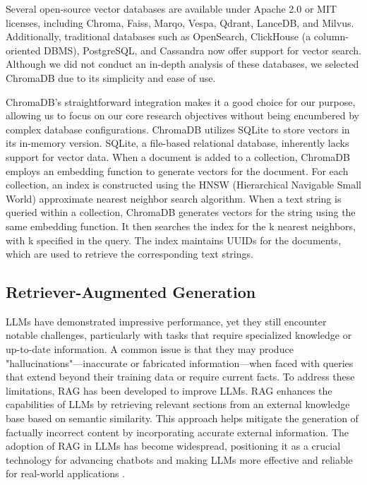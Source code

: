 Several open-source vector databases are available under Apache 2.0 or MIT licenses, including Chroma, Faiss, Marqo, Vespa, Qdrant, LanceDB, and Milvus. Additionally, traditional databases such as OpenSearch, ClickHouse (a column-oriented DBMS), PostgreSQL, and Cassandra now offer support for vector search. Although we did not conduct an in-depth analysis of these databases, we selected ChromaDB due to its simplicity and ease of use.

ChromaDB's straightforward integration makes it a good choice for our purpose, allowing us to focus on our core research objectives without being encumbered by complex database configurations. ChromaDB utilizes SQLite to store vectors in its in-memory version. SQLite, a file-based relational database, inherently lacks support for vector data. When a document is added to a collection, ChromaDB employs an embedding function to generate vectors for the document. For each collection, an index is constructed using the HNSW (Hierarchical Navigable Small World) approximate nearest neighbor search algorithm. When a text string is queried within a collection, ChromaDB generates vectors for the string using the same embedding function. It then searches the index for the k nearest neighbors, with k specified in the query. The index maintains UUIDs for the documents, which are used to retrieve the corresponding text strings.


\subsection{Retriever-Augmented Generation}
LLMs have demonstrated impressive performance, yet they still encounter notable challenges, particularly with tasks that require specialized knowledge or up-to-date information. A common issue is that they may produce "hallucinations"—inaccurate or fabricated information—when faced with queries that extend beyond their training data or require current facts. To address these limitations, RAG has been developed to improve LLMs. RAG enhances the capabilities of LLMs by retrieving relevant sections from an external knowledge base based on semantic similarity. This approach helps mitigate the generation of factually incorrect content by incorporating accurate external information. The adoption of RAG in LLMs has become widespread, positioning it as a crucial technology for advancing chatbots and making LLMs more effective and reliable for real-world applications \cite{Gao.18Dec2023}. 

